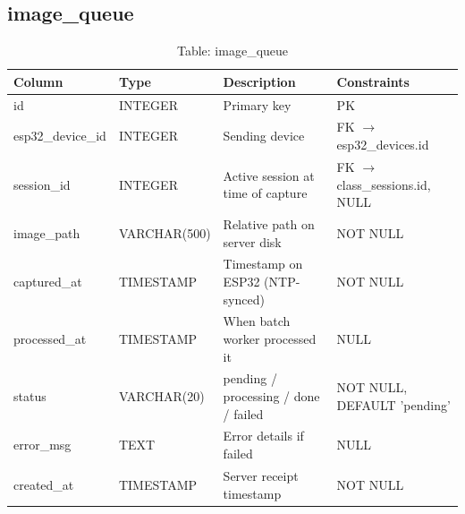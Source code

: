 \documentclass[12pt,a4paper]{report}
\begin{document}
\subsection{image\_queue}
\begin{table}[H]
\centering\small
\caption{Table: image\_queue}
\begin{tabularx}{\linewidth}{llXl}
\toprule
\textbf{Column} & \textbf{Type} & \textbf{Description} & \textbf{Constraints} \\
\midrule
id               & INTEGER      & Primary key                         & PK \\
esp32\_device\_id& INTEGER      & Sending device                      & FK $\to$ esp32\_devices.id \\
session\_id      & INTEGER      & Active session at time of capture   & FK $\to$ class\_sessions.id, NULL \\
image\_path      & VARCHAR(500) & Relative path on server disk        & NOT NULL \\
captured\_at     & TIMESTAMP    & Timestamp on ESP32 (NTP-synced)     & NOT NULL \\
processed\_at    & TIMESTAMP    & When batch worker processed it      & NULL \\
status           & VARCHAR(20)  & pending / processing / done / failed& NOT NULL, DEFAULT 'pending' \\
error\_msg       & TEXT         & Error details if failed             & NULL \\
created\_at      & TIMESTAMP    & Server receipt timestamp            & NOT NULL \\
\bottomrule
\end{tabularx}
\end{table}
\end{document}
